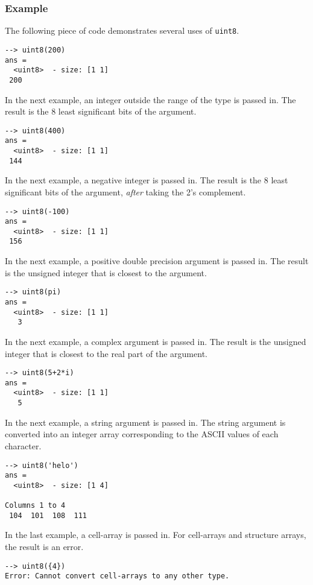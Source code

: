 \subsubsection{Example}
The following piece of code demonstrates several uses of \verb|uint8|.
\begin{verbatim}
--> uint8(200)
ans =
  <uint8>  - size: [1 1]
 200
\end{verbatim}
In the next example, an integer outside the range  of the type is passed in.  The result is the 8 least significant bits of the argument.
\begin{verbatim}
--> uint8(400)
ans =
  <uint8>  - size: [1 1]
 144
\end{verbatim}
In the next example, a negative integer is passed in.  The result is the 8 least significant bits of the argument, \emph{after} taking the 2's complement.
\begin{verbatim}
--> uint8(-100)
ans =
  <uint8>  - size: [1 1]
 156
\end{verbatim}
In the next example, a positive double precision argument is passed in.  The result is the unsigned integer that is closest to the argument.
\begin{verbatim}
--> uint8(pi)
ans =
  <uint8>  - size: [1 1]
   3
\end{verbatim}
In the next example, a complex argument is passed in.  The result is the unsigned integer that is closest to the real part of the argument.
\begin{verbatim}
--> uint8(5+2*i)
ans =
  <uint8>  - size: [1 1]
   5
\end{verbatim}
In the next example, a string argument is passed in.  The string argument is converted into an integer array corresponding to the ASCII values of each character.
\begin{verbatim}
--> uint8('helo')
ans =
  <uint8>  - size: [1 4]
  
Columns 1 to 4
 104  101  108  111
\end{verbatim}
In the last example, a cell-array is passed in.  For cell-arrays and structure arrays, the result is an error.
\begin{verbatim}
--> uint8({4})
Error: Cannot convert cell-arrays to any other type.
\end{verbatim}
